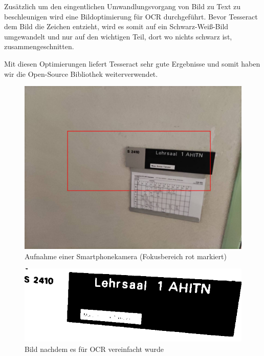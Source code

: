 Zusätzlich um den eingentlichen Umwandlungsvorgang von Bild zu Text zu beschleunigen wird eine Bildoptimierung für OCR durchgeführt. Bevor Tesseract dem Bild die Zeichen entzieht, wird es somit auf ein Schwarz-Weiß-Bild umgewandelt und nur auf den wichtigen Teil, dort wo nichts schwarz ist, zusammengeschnitten. 

Mit diesen Optimierungen liefert Tesseract sehr gute Ergebnisse und somit haben wir die Open-Source Bibliothek weiterverwendet.


\begin{figure}
    \centering
    \includegraphics[width=120mm]{media/OCR/original}
    \caption{Aufnahme einer Smartphonekamera (Fokusbereich rot markiert)}
\end{figure}


\begin{figure}
    \centering
    \includegraphics[width=120mm]{media/OCR/compressed}
    \caption{Bild nachdem es für OCR vereinfacht wurde}
\end{figure}

